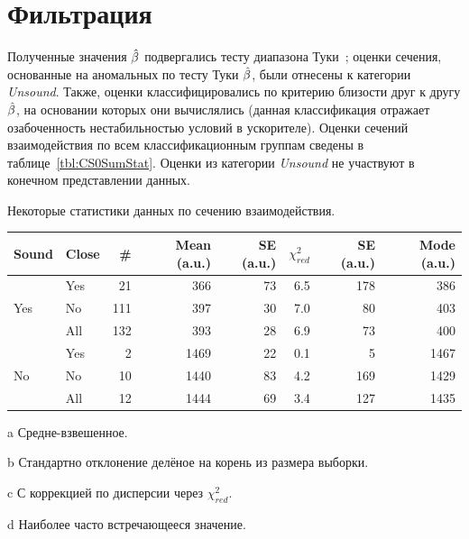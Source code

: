 \documentclass{article}
\begin{document}
	\section{Фильтрация}
	Полученные значения $\slp*$ подвергались тесту диапазона Туки~\cite{Tukey_range_test}; оценки сечения, основанные на аномальных по тесту Туки $\slp*$, были отнесены к категории \emph{Unsound}. Также, оценки классифицировались по критерию близости друг к другу $\slp*$, на основании которых они вычислялись (данная классификация отражает озабоченность нестабильностью условий в ускорителе). Оценки сечений взаимодействия по всем классификационным группам сведены в таблице~\ref{tbl:CS0SumStat}. Оценки из категории \emph{Unsound} не участвуют в конечном представлении данных.
	
	\begin{center}
		\begin{threeparttable}[h!]
			\centering
			\caption{Некоторые статистики данных по сечению взаимодействия.\label{tbl:CS0SumStat}}
			\begin{tabular}{llrrrrrr}
				\hline\hline
				Sound                & Close &  \# & Mean\tnote{a} (a.u.) & SE\tnote{b} (a.u.) & $\chi^2_{red}$ & SE\tnote{c} (a.u.) &  Mode\tnote{d} (a.u.)\\ \hline
				\multirow{3}{*}{Yes} & Yes   &  21 &                  366 &                 73 &            6.5 &                178 &  386 \\
				& No    & 111 &                  397 &                 30 &            7.0 &                 80 &  403 \\
				& All   & 132 &                  393 &                 28 &            6.9 &                 73 &  400 \\ \hline
				\multirow{3}{*}{No}  & Yes   &   2 &                 1469 &                 22 &            0.1 &                  5 & 1467 \\
				& No    &  10 &                 1440 &                 83 &            4.2 &                169 & 1429 \\
				& All   &  12 &                 1444 &                 69 &            3.4 &                127 & 1435 \\ \hline
			\end{tabular}
			\begin{tablenotes}
				\item[a]{Средне-взвешенное.}
				\item[b]{Стандартно отклонение делёное на корень из размера выборки.}
				\item[c]{С коррекцией по дисперсии через $\chi^2_{red}$.}
				\item[d]{Наиболее часто встречающееся значение.}
			\end{tablenotes}
		\end{threeparttable}
	\end{center}
	
\end{document}
